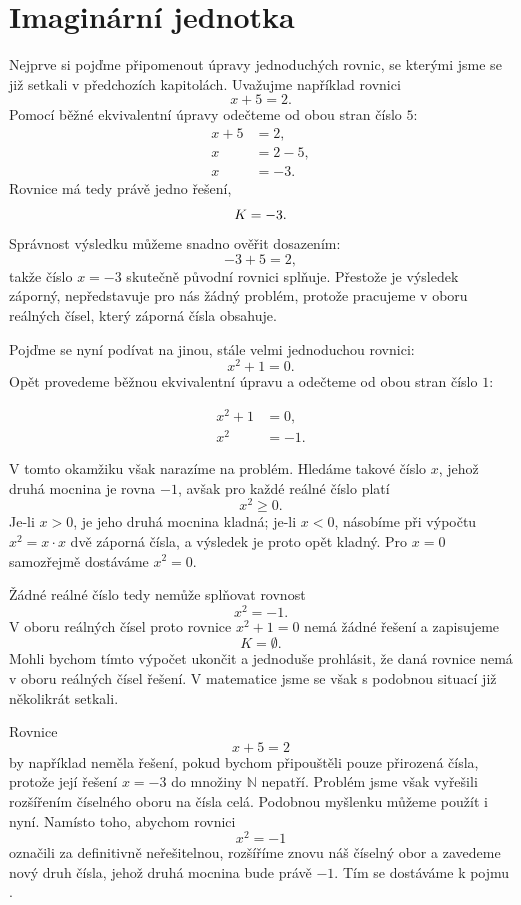 \documentclass[12pt,a4paper]{article}
\begin{document}
\section{Imaginární jednotka}
Nejprve si pojďme připomenout úpravy jednoduchých rovnic, se kterými jsme se již setkali v předchozích kapitolách. Uvažujme například rovnici
\[
x+5=2.
\]
Pomocí běžné ekvivalentní úpravy odečteme od obou stran číslo \(5\):
\begin{align*}
    x+5 &= 2,\\
    x   &= 2-5,\\
    x   &= -3.
\end{align*}
Rovnice má tedy právě jedno řešení,
\[
K=\\{-3\\}.
\]
Správnost výsledku můžeme snadno ověřit dosazením:
\[
    -3+5=2,
\]
takže číslo $x=-3$ skutečně původní rovnici splňuje. Přestože je výsledek záporný, 
nepředstavuje pro nás žádný problém, protože pracujeme v oboru reálných čísel, 
který záporná čísla obsahuje.

Pojďme se nyní podívat na jinou, stále velmi jednoduchou rovnici:
\[
    x^2+1=0.
\]
Opět provedeme běžnou ekvivalentní úpravu a odečteme od obou stran číslo $1$:

\begin{align*}
x^2+1   &= 0,\\
x^2     &= -1.
\end{align*}

V tomto okamžiku však narazíme na problém. Hledáme takové číslo $x$, 
jehož druhá mocnina je rovna \(-1\), avšak pro každé reálné číslo platí
\[
    x^2\geq 0.
\]
Je-li $x>0$, je jeho druhá mocnina kladná; je-li $x<0$, 
násobíme při výpočtu $x^2=x\cdot x$ dvě záporná čísla, 
a výsledek je proto opět kladný. Pro $x=0$ samozřejmě dostáváme $x^2=0$.

Žádné reálné číslo tedy nemůže splňovat rovnost
\[
    x^2=-1.
\]
V oboru reálných čísel proto rovnice $x^2+1=0$ nemá žádné řešení a zapisujeme
\[
    K=\emptyset.
\]
Mohli bychom tímto výpočet ukončit a jednoduše prohlásit, 
že daná rovnice nemá v oboru reálných čísel řešení.
V matematice jsme se však s podobnou situací již několikrát setkali.

Rovnice
\[
    x+5=2
\]
by například neměla řešení, pokud bychom připouštěli pouze přirozená čísla, 
protože její řešení $x=-3$ do množiny $\mathbb{N}$ nepatří. 
Problém jsme však vyřešili rozšířením číselného oboru na čísla celá.
Podobnou myšlenku můžeme použít i nyní. Namísto toho, abychom rovnici
\[
    x^2=-1
\]
označili za definitivně neřešitelnou, rozšíříme znovu náš číselný obor
a zavedeme nový druh čísla, jehož druhá mocnina bude právě $-1$. 
Tím se dostáváme k pojmu .
\end{document}
